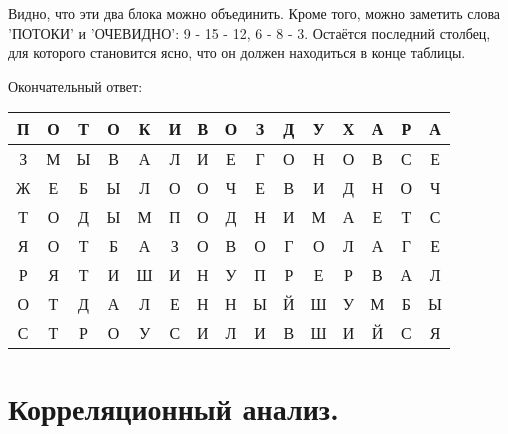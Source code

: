 \documentclass[letterpaper,11pt,openany]{book}
\begin{document}
Видно, что эти два блока можно объединить. Кроме того, можно заметить слова 'ПОТОКИ' и 'ОЧЕВИДНО': 9 - 15 - 12, 6 - 8 - 3. Остаётся последний столбец, для которого становится ясно, что он должен находиться в конце таблицы.

Окончательный ответ:

\medskip

{\centering\bf
\begin{tabular}{||c|c|c|c|c|c|c|c|c|c|c|c|c|c|c||}
\hline
П & О & Т & О & К & И & В & О & З & Д & У & Х & А & Р & А \\
\hline
З & М & Ы & В & А & Л & И & Е & Г & О & Н & О & В & С & Е \\
\hline
Ж & Е & Б & Ы & Л & О & О & Ч & Е & В & И & Д & Н & О & Ч \\
\hline
Т & О & Д & Ы & М & П & О & Д & Н & И & М & А & Е & Т & С \\
\hline
Я & О & Т & Б & А & З & О & В & О & Г & О & Л & А & Г & Е \\
\hline
Р & Я & Т & И & Ш & И & Н & У & П & Р & Е & Р & В & А & Л \\
\hline
О & Т & Д & А & Л & Е & Н & Н & Ы & Й & Ш & У & М & Б & Ы \\
\hline
С & Т & Р & О & У & С & И & Л & И & В & Ш & И & Й & С & Я \\
\hline
\end{tabular}
}

\medskip
\newpage
\section{Корреляционный анализ.}
\end{document}
